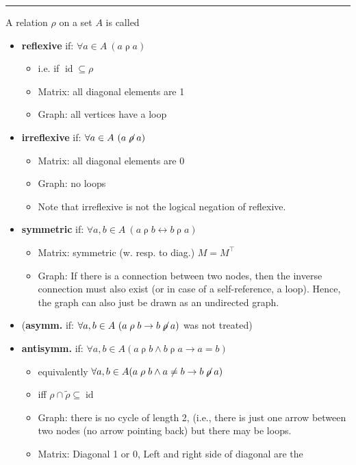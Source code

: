 \documentclass[a4paper]{extarticle}
\DeclareMathOperator{\id}{\text{id}}
\newcommand{\relrho}{\mathrel{\rho}}
\newcommand{\sep}{\vspace{5pt}\noindent\hrule\vspace{5pt}}
\begin{document}
\begin{multicols*}{2}
\sep

 A relation $\rho$ on a set $A$ is called
\begin{itemize}
  \item \textbf{reflexive} if: \quad $\forall a \in A \ (a \relrho a)$
  \begin{itemize}
    \item i.e. if $\id \subseteq \rho$
    \item Matrix: all diagonal elements are 1
    \item Graph: all vertices have a loop
  \end{itemize}
  \item \textbf{irreflexive} if: \quad $\forall a \in A \ (a \not\relrho a)$
  \begin{itemize}
  	\item Matrix: all diagonal elements are 0
  	\item Graph: no loops
  	\item Note that irreflexive is not the logical negation of reflexive.
  \end{itemize}
  \item \textbf{symmetric} if: \quad $\forall a,b\in A \ (a\relrho b
  \leftrightarrow b \relrho a)$
  \begin{itemize}
  	\item Matrix: symmetric (w. resp. to diag.) $M=M^\top$
  	\item Graph: If there is a connection between two nodes, then the inverse
  	connection must also exist (or in case of a self-reference, a loop). Hence,
  	the graph can also just be drawn as an undirected graph.
  \end{itemize}
  \item (\textbf{asymm.} if: $\forall a,b\in A \ (a\relrho b\rightarrow
  b\not\relrho a)$ was not treated)
  \item \textbf{antisymm.} if: \quad  $\forall a,b \in A (a\relrho b \land
  b\relrho a \rightarrow a = b)$
  \begin{itemize}
    \item equivalently $\forall a,b \in A (a\relrho b \land
  a\neq b \rightarrow b\not\relrho a)$
  	\item \Lem iff $\rho\cap\widetilde{\rho}\subseteq \id$
  	\item Graph: there is no cycle of length 2, (i.e., there is just one arrow
  	between two nodes (no arrow pointing back) but there may be loops.
  	\item Matrix: Diagonal 1 or 0, Left and right side of diagonal are the

\end{itemize}
\end{itemize}
\end{multicols*}
\end{document}
